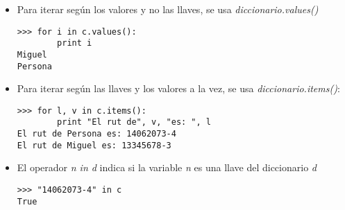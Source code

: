 \begin{itemize}
\item Para iterar según los valores y no las llaves, se usa \textit{diccionario.values()}
\begin{lstlisting}[style=consola]
>>> for i in c.values():
        print i
Miguel
Persona
\end{lstlisting}

\item Para iterar según las llaves y los valores a la vez, se usa \textit{diccionario.items()}:
\begin{lstlisting}[style=consola]
>>> for l, v in c.items():
        print "El rut de", v, "es: ", l
El rut de Persona es: 14062073-4
El rut de Miguel es: 13345678-3
\end{lstlisting}        

\item El operador \textit{n in d} indica si la variable \textit{n} es una llave del diccionario \textit{d}
\begin{lstlisting}[style=consola]
>>> "14062073-4" in c
True
\end{lstlisting}
\end{itemize}
